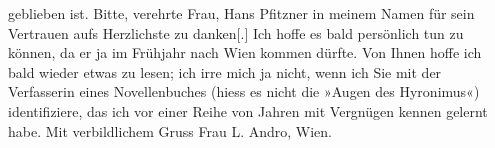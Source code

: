 \begin{ledgroupsized}[t]{13cm}
                    geblieben ist.\pend
           \pstart
           Bitte, verehrte Frau, Hans Pfitzner in meinem
                    Namen für sein Vertrauen aufs Herzlichste zu danken{[}.{]} Ich
                    hoffe es bald persönlich tun zu können, da er ja im Frühjahr nach Wien kommen dürfte. Von Ihnen hoffe ich bald
                    wieder etwas zu lesen; ich irre mich ja nicht, wenn ich Sie mit der Verfasserin
                    eines Novellenbuches (hiess es nicht die »Augen des
                            Hyronimus«) identifiziere, das ich vor
                    einer Reihe von Jahren mit Vergnügen kennen gelernt habe.\pend
           \pstart Mit verbildlichem Gruss\pend{}{\bigskip}\pstart
           \noindent{}Frau L. Andro, Wien.\pend
           \endnumbering{}\end{ledgroupsized}  \newcommand{\dateiname}{L02574}\newcommand{\titel}{Arthur Schnitzler an Therese Rie-Andro, 12. 2. 1912}\newcommand{\editorInnen}{Martin Anton Müller und Gerd-Hermann Susen}
      